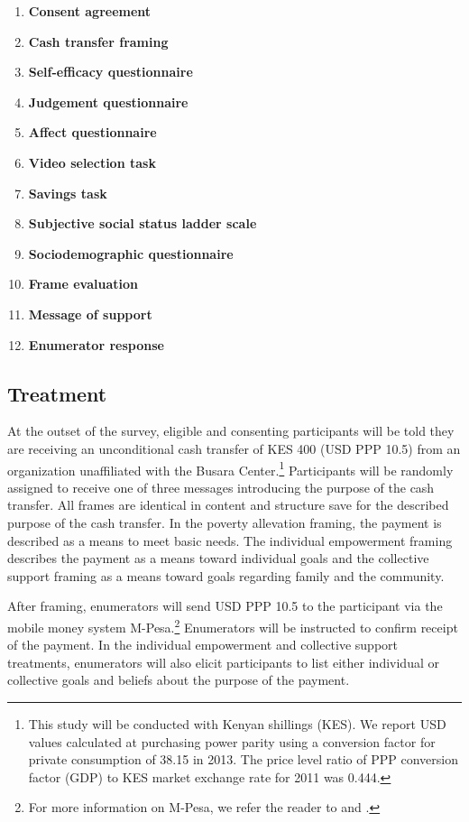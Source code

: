 \documentclass[11pt, a4paper]{article}\usepackage[]{graphicx}\usepackage[]{color}
\begin{document}
        \begin{enumerate}
            \item \textbf{Consent agreement}
            \item \textbf{Cash transfer framing}
            \item \textbf{Self-efficacy questionnaire}
            \item \textbf{Judgement questionnaire}
            \item \textbf{Affect questionnaire}
            \item \textbf{Video selection task}
            \item \textbf{Savings task}
            \item \textbf{Subjective social status ladder scale}
            \item \textbf{Sociodemographic questionnaire}
            \item \textbf{Frame evaluation}
            \item \textbf{Message of support}
            \item \textbf{Enumerator response}
        \end{enumerate}

    \subsection{Treatment}

        At the outset of the survey, eligible and consenting participants will be told they are receiving an unconditional cash transfer of KES 400 (USD PPP 10.5) from an organization unaffiliated with the Busara Center.\footnote{This study will be conducted with Kenyan shillings (KES). We report USD values calculated at purchasing power parity using a conversion factor for private consumption of 38.15 in 2013. The price level ratio of PPP conversion factor (GDP) to KES market exchange rate for 2011 was 0.444.} Participants will be randomly assigned to receive one of three messages introducing the purpose of the cash transfer. All frames are identical in content and structure save for the described purpose of the cash transfer. In the poverty allevation framing, the payment is described as a means to meet basic needs. The individual empowerment framing describes the payment as a means toward individual goals and the collective support framing as a means toward goals regarding family and the community.

        After framing, enumerators will send USD PPP 10.5 to the participant via the mobile money system M-Pesa.\footnote{For more information on M-Pesa, we refer the reader to \textcite{jack_mobile_2011} and \textcite{mbiti_mobile_2011}.} Enumerators will be instructed to confirm receipt of the payment. In the individual empowerment and collective support treatments, enumerators will also elicit participants to list either individual or collective goals and beliefs about the purpose of the payment.
\end{document}
